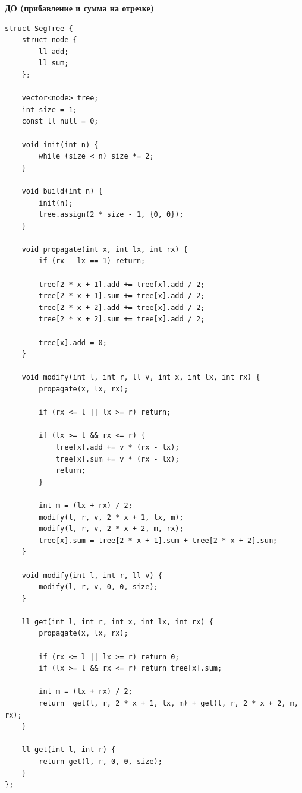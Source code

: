 \documentclass[a4paper, 10pt]{article}
\begin{document}
{\Large \textbf{ДО (прибавление и сумма на отрезке)}}
\begin{lstlisting}
struct SegTree {
    struct node {
        ll add;
        ll sum;
    };

    vector<node> tree;
    int size = 1;
    const ll null = 0;

    void init(int n) {
        while (size < n) size *= 2;
    }

    void build(int n) {
        init(n);
        tree.assign(2 * size - 1, {0, 0});
    }

    void propagate(int x, int lx, int rx) {
        if (rx - lx == 1) return;

        tree[2 * x + 1].add += tree[x].add / 2;
        tree[2 * x + 1].sum += tree[x].add / 2;
        tree[2 * x + 2].add += tree[x].add / 2;
        tree[2 * x + 2].sum += tree[x].add / 2;

        tree[x].add = 0;
    }

    void modify(int l, int r, ll v, int x, int lx, int rx) {
        propagate(x, lx, rx);

        if (rx <= l || lx >= r) return;

        if (lx >= l && rx <= r) {
            tree[x].add += v * (rx - lx);
            tree[x].sum += v * (rx - lx);
            return;
        }

        int m = (lx + rx) / 2;
        modify(l, r, v, 2 * x + 1, lx, m);
        modify(l, r, v, 2 * x + 2, m, rx);
        tree[x].sum = tree[2 * x + 1].sum + tree[2 * x + 2].sum;
    }

    void modify(int l, int r, ll v) {
        modify(l, r, v, 0, 0, size);
    }

    ll get(int l, int r, int x, int lx, int rx) {
        propagate(x, lx, rx);

        if (rx <= l || lx >= r) return 0;
        if (lx >= l && rx <= r) return tree[x].sum;

        int m = (lx + rx) / 2;
        return  get(l, r, 2 * x + 1, lx, m) + get(l, r, 2 * x + 2, m, rx);
    }
    
    ll get(int l, int r) {
        return get(l, r, 0, 0, size);
    }
};
\end{lstlisting}
\end{document}
